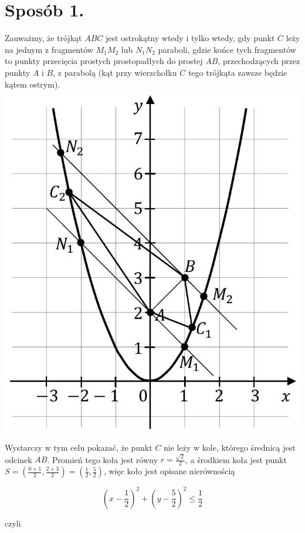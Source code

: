 \documentclass[10pt]{article}
\begin{document}
\section*{Sposób 1.}
Zauważmy, że trójkąt $A B C$ jest ostrokątny wtedy i tylko wtedy, gdy punkt $C$ leży na jednym z fragmentów $M_{1} M_{2}$ lub $N_{1} N_{2}$ paraboli, gdzie końce tych fragmentów to punkty przecięcia prostych prostopadłych do prostej $A B$, przechodzących przez punkty $A$ i $B$, z parabolą (kąt przy wierzchołku $C$ tego trójkąta zawsze będzie kątem ostrym).\\
\includegraphics[max width=\textwidth, center]{2025_02_07_36131546116d12814c9cg-49}

Wystarczy w tym celu pokazać, że punkt $C$ nie leży w kole, którego średnicą jest odcinek $A B$. Promień tego koła jest równy $r=\frac{\sqrt{2}}{2}$, a środkiem koła jest punkt $S=\left(\frac{0+1}{2}, \frac{2+3}{2}\right)=\left(\frac{1}{2}, \frac{5}{2}\right)$, więc koło jest opisane nierównością

$$
\left(x-\frac{1}{2}\right)^{2}+\left(y-\frac{5}{2}\right)^{2} \leq \frac{1}{2}
$$

czyli
\end{document}

